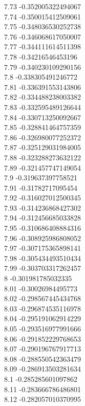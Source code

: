 {7.73	-0.352005322494067\\
7.74	-0.350015412509061\\
7.75	-0.348036530252738\\
7.76	-0.346068617050007\\
7.77	-0.344111614511398\\
7.78	-0.34216546453196\\
7.79	-0.340230109290156\\
7.8	-0.338305491246772\\
7.81	-0.336391553143806\\
7.82	-0.334488238003382\\
7.83	-0.332595489126644\\
7.84	-0.330713250092667\\
7.85	-0.328841464757359\\
7.86	-0.326980077252372\\
7.87	-0.325129031984005\\
7.88	-0.323288273632122\\
7.89	-0.321457747149054\\
7.9	-0.319637397758521\\
7.91	-0.31782717095454\\
7.92	-0.316027012500345\\
7.93	-0.314236868427302\\
7.94	-0.312456685033828\\
7.95	-0.310686408884316\\
7.96	-0.308925986808052\\
7.97	-0.307175365898141\\
7.98	-0.305434493510434\\
7.99	-0.303703317262457\\
8	-0.301981785032335\\
8.01	-0.30026984495773\\
8.02	-0.298567445434768\\
8.03	-0.296874535116978\\
8.04	-0.295191062914229\\
8.05	-0.293516977991666\\
8.06	-0.291852229768653\\
8.07	-0.290196767917713\\
8.08	-0.288550542363479\\
8.09	-0.286913503281634\\
8.1	-0.285285601097862\\
8.11	-0.283666786486801\\
8.12	-0.282057010370995\\
}
